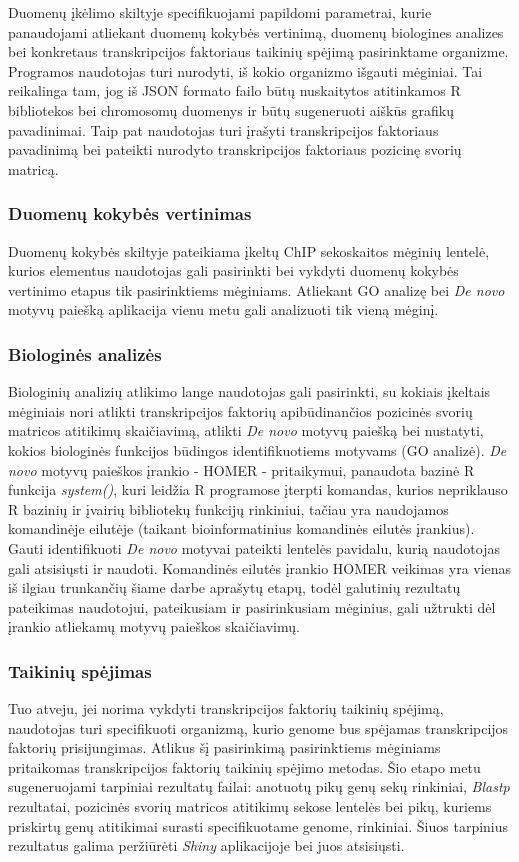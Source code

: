 \documentclass[12pt]{article}
\begin{document}
Duomenų įkėlimo skiltyje specifikuojami papildomi parametrai, kurie panaudojami
atliekant duomenų kokybės vertinimą, duomenų biologines analizes bei konkretaus
transkripcijos faktoriaus taikinių spėjimą pasirinktame organizme. Programos
naudotojas turi nurodyti, iš kokio organizmo išgauti mėginiai. Tai reikalinga
tam, jog iš JSON\cite{JSON} formato failo būtų nuskaitytos atitinkamos R
bibliotekos bei chromosomų duomenys ir būtų sugeneruoti aiškūs grafikų 
pavadinimai. Taip pat naudotojas turi įrašyti transkripcijos faktoriaus
pavadinimą bei pateikti nurodyto transkripcijos faktoriaus pozicinę svorių
matricą.

\subsubsection*{Duomenų kokybės vertinimas}
Duomenų kokybės skiltyje pateikiama įkeltų ChIP sekoskaitos mėginių
lentelė, kurios elementus naudotojas gali pasirinkti bei vykdyti duomenų
kokybės vertinimo etapus tik pasirinktiems mėginiams. Atliekant GO analizę bei
\emph{De novo} motyvų paiešką aplikacija vienu metu gali analizuoti tik vieną
mėginį.

\subsubsection*{Biologinės analizės}
Biologinių analizių atlikimo lange naudotojas gali pasirinkti, su kokiais
įkeltais mėginiais nori atlikti transkripcijos faktorių apibūdinančios pozicinės
svorių matricos atitikimų skaičiavimą, atlikti \emph{De novo} motyvų paiešką
bei nustatyti, kokios biologinės funkcijos būdingos identifikuotiems motyvams
(GO analizė). \emph{De novo} motyvų paieškos įrankio - HOMER -
pritaikymui, panaudota bazinė R funkcija \emph{system()}, kuri leidžia
R programose įterpti komandas, kurios nepriklauso R bazinių ir įvairių
bibliotekų funkcijų rinkiniui, tačiau yra naudojamos komandinėje eilutėje
(taikant bioinformatinius komandinės eilutės įrankius). Gauti identifikuoti
\emph{De novo} motyvai pateikti lentelės pavidalu, kurią naudotojas gali
atsisiųsti ir naudoti. Komandinės eilutės įrankio HOMER veikimas yra
vienas iš ilgiau trunkančių šiame darbe aprašytų etapų, todėl galutinių
rezultatų pateikimas naudotojui, pateikusiam ir pasirinkusiam mėginius, gali
užtrukti dėl įrankio atliekamų motyvų paieškos skaičiavimų. 

\subsubsection*{Taikinių spėjimas}
Tuo atveju, jei norima vykdyti transkripcijos faktorių taikinių spėjimą,
naudotojas turi specifikuoti organizmą, kurio genome bus spėjamas transkripcijos
faktorių prisijungimas. Atlikus šį pasirinkimą pasirinktiems mėginiams
pritaikomas transkripcijos faktorių taikinių spėjimo metodas. Šio etapo metu
sugeneruojami tarpiniai rezultatų failai: anotuotų pikų genų sekų rinkiniai,
\emph{Blastp} rezultatai, pozicinės svorių matricos atitikimų sekose lentelės
bei pikų, kuriems priskirtų genų atitikimai surasti specifikuotame genome,
rinkiniai. Šiuos tarpinius rezultatus galima per\-žiū\-rė\-ti \emph{Shiny}
aplikacijoje bei juos atsisiųsti.
\end{document}
